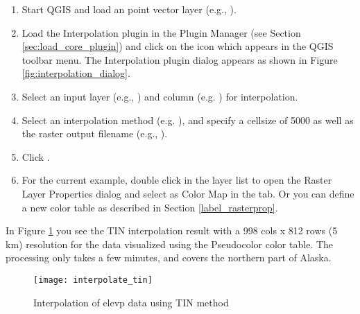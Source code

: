 \begin{enumerate}
  \item Start QGIS and load an point vector layer (e.g., ). 
  \item Load the Interpolation plugin in the Plugin Manager (see Section 
  \ref{sec:load_core_plugin}) and click on the  
  icon which appears in the QGIS toolbar menu. The Interpolation plugin dialog appears as 
  shown in Figure \ref{fig:interpolation_dialog}.
  \item Select an input layer (e.g., ) and column (e.g. ) for 
  interpolation.
  \item Select an interpolation method (e.g. ), and specify a cellsize of 5000 as well as the raster output filename (e.g., ).
  \item Click .
  \item For the current example, double click  in the layer list to open the Raster Layer Properties 
  dialog and select  as Color Map in the  tab. Or you 
  can define a new color table as described in Section \ref{label_rasterprop}.
\end{enumerate}

In Figure \ref{fig:interpolation_idw} you see the TIN interpolation result with a 998 cols x 812 rows (5 km) resolution for the  data visualized using the Pseudocolor color table. The processing only takes a few minutes, and covers the northern part of Alaska.

\begin{figure}[ht]
   \centering
   \texttt{[image: interpolate\_tin]}
   \caption{Interpolation of elevp data using TIN method \nixcaption}\label{fig:interpolation_idw}
\end{figure}

\FloatBarrier
